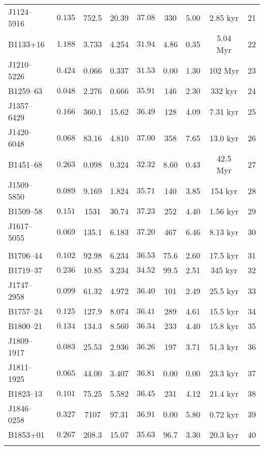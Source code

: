 \begin{table*}
\begin{center}
\begin{tabular}{|l|c|c|c|c|c|c|c|c|}
        J1124--5916  &   $0.135$  &  752.5  &  20.39  &   $37.08$  &  330  &  5.00  &  2.85 kyr &  21  \\
        {\color{red}B1133+16}  &   $1.188$  &  3.733  &  4.254  &   $31.94$  &  4.86  &  0.35  &  5.04 Myr &  22  \\
        J1210--5226  &   $0.424$  &  0.066  &  0.337  &   $31.53$  &  0.00  &  1.30  &  102 Myr &  23  \\
        B1259--63  &   $0.048$  &  2.276  &  0.666  &   $35.91$  &  146  &  2.30  &  332 kyr &  24  \\
        J1357--6429  &   $0.166$  &  360.1  &  15.62  &   $36.49$  &  128  &  4.09  &  7.31 kyr &  25  \\
        J1420--6048  &   $0.068$  &  83.16  &  4.810  &   $37.00$  &  358  &  7.65  &  13.0 kyr &  26  \\
        {\color{red}B1451--68}  &   $0.263$  &  0.098  &  0.324  &   $32.32$  &  8.60  &  0.43  &  42.5 Myr &  27  \\
        J1509--5850  &   $0.089$  &  9.169  &  1.824  &   $35.71$  &  140  &  3.85  &  154 kyr &  28  \\
        B1509--58  &   $0.151$  &  1531  &  30.74  &   $37.23$  &  252  &  4.40  &  1.56 kyr &  29  \\
        J1617--5055  &   $0.069$  &  135.1  &  6.183  &   $37.20$  &  467  &  6.46  &  8.13 kyr &  30  \\
        & & & & & & & & \\
            
        B1706--44  &   $0.102$  &  92.98  &  6.234  &   $36.53$  &  75.6  &  2.60  &  17.5 kyr &  31  \\
        {\color{red}B1719--37}  &   $0.236$  &  10.85  &  3.234  &   $34.52$  &  99.5  &  2.51  &  345 kyr &  32  \\
        J1747--2958  &   $0.099$  &  61.32  &  4.972  &   $36.40$  &  101  &  2.49  &  25.5 kyr &  33  \\
        B1757--24  &   $0.125$  &  127.9  &  8.074  &   $36.41$  &  289  &  4.61  &  15.5 kyr &  34  \\
        B1800--21  &   $0.134$  &  134.3  &  8.560  &   $36.34$  &  233  &  4.40  &  15.8 kyr &  35  \\
        J1809--1917  &   $0.083$  &  25.53  &  2.936  &   $36.26$  &  197  &  3.71  &  51.3 kyr &  36  \\
        J1811--1925  &   $0.065$  &  44.00  &  3.407  &   $36.81$  &  0.00  &  0.00  &  23.3 kyr &  37  \\
        B1823--13  &   $0.101$  &  75.25  &  5.582  &   $36.45$  &  231  &  4.12  &  21.4 kyr &  38  \\
        J1846--0258  &   $0.327$  &  7107  &  97.31  &   $36.91$  &  0.00  &  5.80  &  0.72 kyr &  39  \\
        B1853+01  &   $0.267$  &  208.3  &  15.07  &   $35.63$  &  96.7  &  3.30  &  20.3 kyr &  40  \\
        & & & & & & & & \\
            

\end{tabular}
\end{center}
\end{table*}
